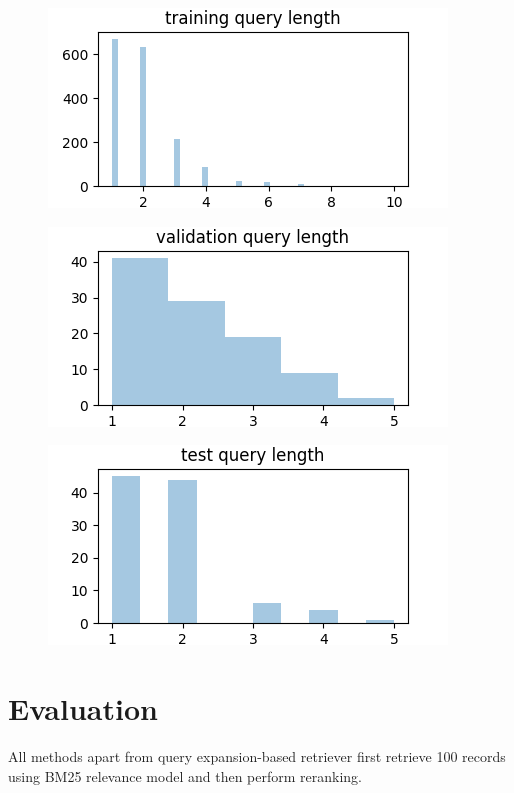 \documentclass{article}
\begin{document}
\begin{figure}[h!]
\centering
\includegraphics[scale=1.1]{images/training_query_length.png}
\label{fig:universe}
\end{figure}

\begin{figure}[h!]
\centering
\includegraphics[scale=1.1]{images/validation_query_length.png}
\label{fig:universe}
\end{figure}

\begin{figure}[h!]
\centering
\includegraphics[scale=1.1]{images/test_query_length.png}
\label{fig:universe}
\end{figure}

\section{Evaluation}

All methods apart from query expansion-based retriever first retrieve 100 records using BM25 relevance model and then perform reranking.
\end{document}
